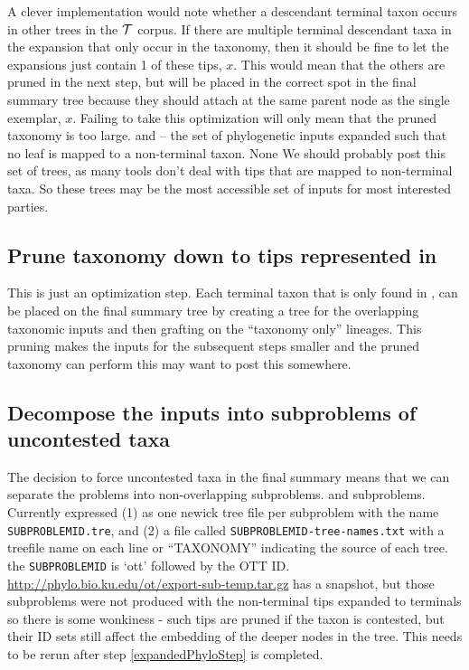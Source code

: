 \documentclass[11pt]{article}
\begin{document}
    A clever implementation would note whether a descendant terminal taxon occurs in other
        trees in the $\mathcal{T}$ corpus. 
    If there are multiple terminal descendant taxa in the expansion that only occur in the 
        taxonomy, then it should be fine to let the expansions just contain 1 of these tips, $x$.
    This would mean that the others are pruned in the next step, but will be placed in the 
    correct spot in the final summary tree because they should attach at the same parent node
    as the single exemplar, $x$. Failing to take this optimization will only mean that the 
    pruned taxonomy is too large.
\stepInput \taxonomy and \phyloInputs
\stepOutput \expandedPhylo -- the set of phylogenetic inputs expanded such that no leaf is mapped 
    to a non-terminal taxon.
    \currImpl None
    \implTODO {}
\currURL We should probably post this set of trees, as many tools don't deal with tips that 
are mapped to non-terminal taxa. So these trees may be the most accessible set of inputs
for most interested parties.
 
\subsection{Prune taxonomy down to tips represented in \expandedPhylo}\label{prunedTaxonomyStep}
\stepExplanation This is just an optimization step.
Each terminal taxon that is only found in \taxonomy, can be placed on the 
    final summary tree by creating a tree for the overlapping taxonomic
    inputs and then grafting on the ``taxonomy only'' lineages.
This pruning makes the inputs for the subsequent steps smaller
\stepInput \taxonomy and \expandedPhylo
\stepOutput \prunedTaxonomy the pruned taxonomy
\currImpl \otcprune can perform this
\implTODO
\currURL may want to post this somewhere. 

\subsection{Decompose the inputs into subproblems of uncontested taxa}\label{decomposeStep}
\stepExplanation The decision to force uncontested taxa in the final
    summary means that we can separate the problems into non-overlapping
    subproblems.
\stepInput \prunedTaxonomy and \expandedPhylo
\stepOutput subproblems. Currently expressed (1) as one newick tree file  per subproblem
    with the name \texttt{SUBPROBLEMID.tre}, and
    (2) a file called \texttt{SUBPROBLEMID-tree-names.txt} with a treefile name 
    on each line or ``TAXONOMY'' indicating the source of each tree. 
    the \texttt{SUBPROBLEMID} is `ott' followed by the OTT ID.
\currImpl \otcdecompose
\implTODO 
\currURL \url{http://phylo.bio.ku.edu/ot/export-sub-temp.tar.gz} has a snapshot, but
those subproblems were not produced with the non-terminal tips expanded to terminals
so there is some wonkiness - such tips are pruned if the taxon is contested, but their
ID sets still affect the embedding of the deeper nodes in the tree. This needs 
to be rerun after step \ref{expandedPhyloStep} is completed.
 
\end{document}
